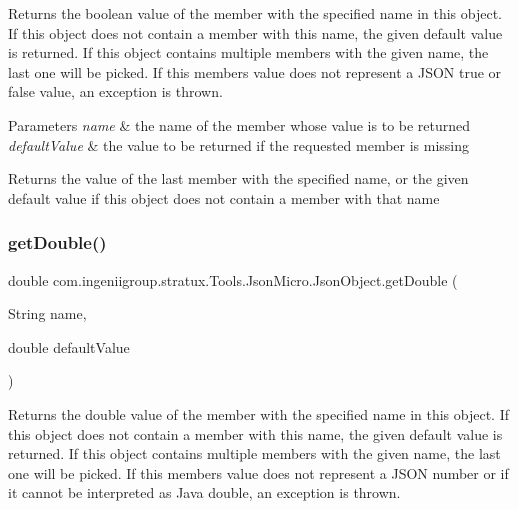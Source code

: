 Returns the {\ttfamily boolean} value of the member with the specified name in this object. If this object does not contain a member with this name, the given default value is returned. If this object contains multiple members with the given name, the last one will be picked. If this member\textquotesingle{}s value does not represent a J\+S\+ON {\ttfamily true} or {\ttfamily false} value, an exception is thrown.


\begin{DoxyParams}{Parameters}
{\em name} & the name of the member whose value is to be returned \\
\hline
{\em default\+Value} & the value to be returned if the requested member is missing \\
\hline
\end{DoxyParams}
\begin{DoxyReturn}{Returns}
the value of the last member with the specified name, or the given default value if this object does not contain a member with that name 
\end{DoxyReturn}
\mbox{\label{classcom_1_1ingeniigroup_1_1stratux_1_1_tools_1_1_json_micro_1_1_json_object_a6fdae7ae3cae6e5ddcc4bf714d231669}} 
\subsubsection{\texorpdfstring{get\+Double()}{getDouble()}}
{\footnotesize\ttfamily double com.\+ingeniigroup.\+stratux.\+Tools.\+Json\+Micro.\+Json\+Object.\+get\+Double (\begin{DoxyParamCaption}\item[{String}]{name,  }\item[{double}]{default\+Value }\end{DoxyParamCaption})}

Returns the {\ttfamily double} value of the member with the specified name in this object. If this object does not contain a member with this name, the given default value is returned. If this object contains multiple members with the given name, the last one will be picked. If this member\textquotesingle{}s value does not represent a J\+S\+ON number or if it cannot be interpreted as Java {\ttfamily double}, an exception is thrown.


